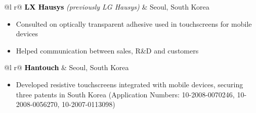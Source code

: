\documentclass[letterpaper,10pt]{article}
\begin{document}
\vspace{-2mm}

\begin{tabularx}{\linewidth}{ @{}l r@{} }
\textcolor{Black}{\textbf{LX Hausys}} \textit{(previously LG Hausys)} & \hfill Seoul, South Korea \\[2pt]
\end{tabularx}
\vspace{-1em}
\begin{itemize}[nosep,after=\strut, leftmargin=1em, itemsep=2pt]
    \item Consulted on optically transparent adhesive used in touchscreens for mobile devices
    \item Helped communication between sales, R\&D and customers
\end{itemize}

\vspace{-2mm}

\begin{tabularx}{\linewidth}{ @{}l r@{} }
\textcolor{Black}{\textbf{Hantouch}} & \hfill Seoul, South Korea \\[2pt]
\end{tabularx}
\vspace{-1em}
\begin{itemize}[nosep,after=\strut, leftmargin=1em, itemsep=2pt]
    \item Developed resistive touchscreens integrated with  mobile devices, securing three patents in South Korea (Application Numbers: 10-2008-0070246, 10-2008-0056270, 10-2007-0113098)
\end{itemize}
\vspace{-2mm}
\end{document}
